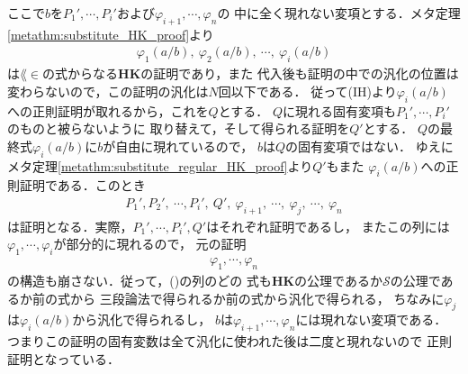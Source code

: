 \begin{metaprf}
\begin{description}
				ここで$b$を$P_{1}',\cdots,P_{i}'$および$\varphi_{i+1},\cdots,\varphi_{n}$の
				中に全く現れない変項とする．メタ定理\ref{metathm:substitute_HK_proof}より
				\begin{align}
					\varphi_{1}(a/b),\ \varphi_{2}(a/b),\ \cdots,\ \varphi_{i}(a/b)
				\end{align}
				は$\lang{\in}$の式からなる{\bf HK}の証明であり，また
				代入後も証明の中での汎化の位置は変わらないので，この証明の汎化は$N$回以下である．
				従って(IH)より$\varphi_{i}(a/b)$への正則証明が取れるから，これを$Q$とする．
				$Q$に現れる固有変項も$P_{1}',\cdots,P_{i}'$のものと被らないように
				取り替えて，そして得られる証明を$Q'$とする．
				$Q$の最終式$\varphi_{i}(a/b)$に$b$が自由に現れているので，
				$b$は$Q$の固有変項ではない．
				ゆえにメタ定理\ref{metathm:substitute_regular_HK_proof}より$Q'$もまた
				$\varphi_{i}(a/b)$への正則証明である．このとき
				\begin{align}
					P_{1}',P_{2}',\ \cdots,P_{i}',\ Q',\ \varphi_{i+1},\ 
					\cdots,\ \varphi_{j},\ \cdots,\ \varphi_{n}
					\label{seq:regularization_of_HK_proof_1}
				\end{align}
				は証明となる．実際，$P_{1}',\cdots,P_{i}',Q'$はそれぞれ証明であるし，
				またこの列には$\varphi_{1},\cdots,\varphi_{i}$が部分的に現れるので，
				元の証明
				\begin{align}
					\varphi_{1},\cdots,\varphi_{n}
				\end{align}
				の構造も崩さない．従って，()の列のどの
				式も{\bf HK}の公理であるか$\mathscr{S}$の公理であるか前の式から
				三段論法で得られるか前の式から汎化で得られる，
				ちなみに$\varphi_{j}$は$\varphi_{i}(a/b)$から汎化で得られるし，
				$b$は$\varphi_{i+1},\cdots,\varphi_{n}$には現れない変項である．
				つまりこの証明の固有変数は全て汎化に使われた後は二度と現れないので
				正則証明となっている．
				\QED
		\end{description}
	\end{metaprf}
	
